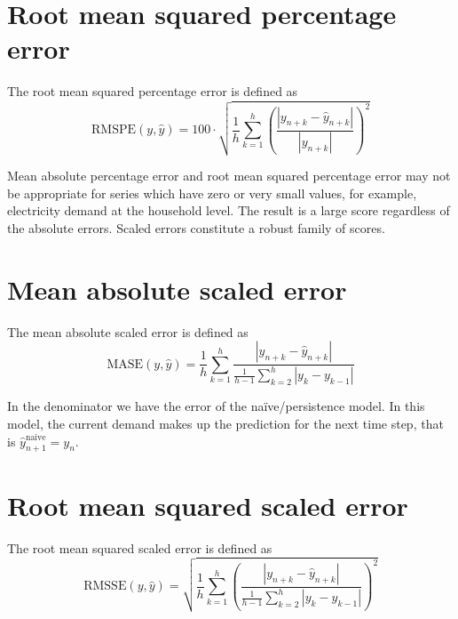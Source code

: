 \section{Root mean squared percentage error}\label{rmspe}
\begin{definition}
    The root mean squared percentage error is defined as
    $$
    \mathrm{RMSPE}(y,\hat{y})=100\cdot\sqrt{\frac{1}{h}\sum\limits_{k=1}^{h} \left(\frac{|y_{n+k}-\hat{y}_{n+k}|}{|y_{n+k}|}\right)^2}
    $$
\end{definition}
Mean absolute percentage error and root mean squared percentage error may not be appropriate for series which have zero or very small values, for example, electricity demand at the household level. The result is a large score regardless of the absolute errors.
Scaled errors constitute a robust family of scores.
\section{Mean absolute scaled error}\label{mase}
\begin{definition}
    The mean absolute scaled error is defined as
    $$
    \mathrm{MASE}(y,\hat{y})=\frac{1}{h}\sum\limits_{k=1}^h\frac{|y_{n+k}-\hat{y}_{n+k}|}{\frac{1}{h-1}\sum\limits_{k=2}^{h}|y_{k}-y_{k-1}|}
    $$
\end{definition}
In the denominator we have the error of the naïve/persistence model. 
In this model, the current demand makes up the prediction for the next time step, that is $\hat{y}^{\mathrm{naive}}_{n+1}=y_{n}$.
\section{Root mean squared scaled error}\label{rmsse}
\begin{definition}
    The root mean squared scaled error is defined as
    $$
    \mathrm{RMSSE}(y,\hat{y})=\sqrt{\frac{1}{h}\sum\limits_{k=1}^h\left(\frac{|y_{n+k}-\hat{y}_{n+k}|}{\frac{1}{h-1}\sum\limits_{k=2}^{h}|y_{k}-y_{k-1}|}\right)^2}
    $$
\end{definition}


